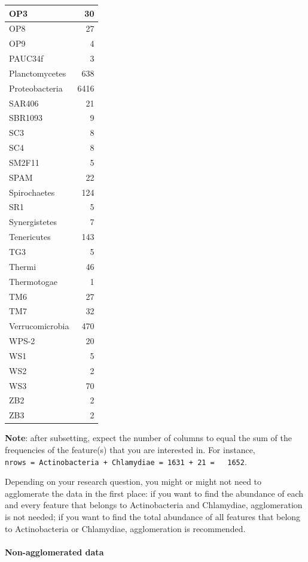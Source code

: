 \documentclass[
]{book}
\begin{document}
\begin{table}
{\begin{tabular}{l|r}
\hline
OP3 & 30\\
\hline
OP8 & 27\\
\hline
OP9 & 4\\
\hline
PAUC34f & 3\\
\hline
Planctomycetes & 638\\
\hline
Proteobacteria & 6416\\
\hline
SAR406 & 21\\
\hline
SBR1093 & 9\\
\hline
SC3 & 8\\
\hline
SC4 & 8\\
\hline
SM2F11 & 5\\
\hline
SPAM & 22\\
\hline
Spirochaetes & 124\\
\hline
SR1 & 5\\
\hline
Synergistetes & 7\\
\hline
Tenericutes & 143\\
\hline
TG3 & 5\\
\hline
Thermi & 46\\
\hline
Thermotogae & 1\\
\hline
TM6 & 27\\
\hline
TM7 & 32\\
\hline
Verrucomicrobia & 470\\
\hline
WPS-2 & 20\\
\hline
WS1 & 5\\
\hline
WS2 & 2\\
\hline
WS3 & 70\\
\hline
ZB2 & 2\\
\hline
ZB3 & 2\\
\hline
\end{tabular}}
\end{table}

\textbf{Note}: after subsetting, expect the number of columns to equal the
sum of the frequencies of the feature(s) that you are interested
in. For instance, \texttt{nrows\ =\ Actinobacteria\ +\ Chlamydiae\ =\ 1631\ +\ 21\ =\ \ \ 1652}.

Depending on your research question, you might or might not need to
agglomerate the data in the first place: if you want to find the
abundance of each and every feature that belongs to Actinobacteria and
Chlamydiae, agglomeration is not needed; if you want to find the total
abundance of all features that belong to Actinobacteria or
Chlamydiae, agglomeration is recommended.

\hypertarget{non-agglomerated-data}{%
\paragraph{Non-agglomerated data}\label{non-agglomerated-data}}
\end{document}
